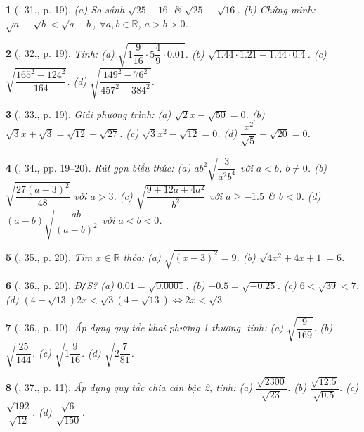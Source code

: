 \documentclass{article}
\newtheorem{baitoan}{}
\begin{document}
\begin{baitoan}[\cite{SGK_Toan_9_tap_1}, 31., p. 19]
	(a) So sánh $\sqrt{25 - 16}$ \& $\sqrt{25} - \sqrt{16}$. (b) Chứng minh: $\sqrt{a} - \sqrt{b} < \sqrt{a - b}$, $\forall a,b\in\mathbb{R}$, $a > b > 0$.
\end{baitoan}

\begin{baitoan}[\cite{SGK_Toan_9_tap_1}, 32., p. 19]
	Tính: (a) $\sqrt{1\dfrac{9}{16}\cdot5\dfrac{4}{9}\cdot0.01}$. (b) $\sqrt{1.44\cdot1.21 - 1.44\cdot0.4}$. (c) $\sqrt{\dfrac{165^2 - 124^2}{164}}$. (d) $\sqrt{\dfrac{149^2 - 76^2}{457^2 - 384^2}}$.
\end{baitoan}

\begin{baitoan}[\cite{SGK_Toan_9_tap_1}, 33., p. 19]
	Giải phương trình: (a)  $\sqrt{2}x - \sqrt{50} = 0$. (b) $\sqrt{3}x + \sqrt{3} = \sqrt{12} + \sqrt{27}$. (c) $\sqrt{3}x^2 - \sqrt{12} = 0$. (d) $\dfrac{x^2}{\sqrt{5}} - \sqrt{20} = 0$.
\end{baitoan}

\begin{baitoan}[\cite{SGK_Toan_9_tap_1}, 34., pp. 19--20]
	Rút gọn biểu thức: (a) $ab^2\sqrt{\dfrac{3}{a^2b^4}}$ với $a < b$, $b\ne0$. (b) $\sqrt{\dfrac{27(a - 3)^2}{48}}$ với $a > 3$. (c) $\sqrt{\dfrac{9 + 12a + 4a^2}{b^2}}$ với $a\ge-1.5$ \& $b < 0$. (d) $(a - b)\sqrt{\dfrac{ab}{(a - b)^2}}$ với $a < b < 0$.
\end{baitoan}

\begin{baitoan}[\cite{SGK_Toan_9_tap_1}, 35., p. 20]
	Tìm $x\in\mathbb{R}$ thỏa: (a) $\sqrt{(x - 3)^2} = 9$. (b) $\sqrt{4x^2 + 4x + 1} = 6$.
\end{baitoan}

\begin{baitoan}[\cite{SGK_Toan_9_tap_1}, 36., p. 20]
	\emph{Đ\texttt{/}S?} (a) $0.01 = \sqrt{0.0001}$. (b) $-0.5 = \sqrt{-0.25}$. (c) $6 < \sqrt{39} < 7$. (d) $(4 - \sqrt{13})2x < \sqrt{3}(4 - \sqrt{13})\Leftrightarrow2x < \sqrt{3}$.
\end{baitoan}

\begin{baitoan}[\cite{SBT_Toan_9_tap_1}, 36., p. 10]
	Áp dụng quy tắc khai phương 1 thương, tính: (a) $\sqrt{\dfrac{9}{169}}$. (b) $\sqrt{\dfrac{25}{144}}$. (c) $\sqrt{1\dfrac{9}{16}}$. (d) $\sqrt{2\dfrac{7}{81}}$.
\end{baitoan}

\begin{baitoan}[\cite{SBT_Toan_9_tap_1}, 37., p. 11]
	Áp dụng quy tắc chia căn bậc 2, tính: (a) $\dfrac{\sqrt{2300}}{\sqrt{23}}$. (b) $\dfrac{\sqrt{12.5}}{\sqrt{0.5}}$. (c) $\dfrac{\sqrt{192}}{\sqrt{12}}$. (d) $\dfrac{\sqrt{6}}{\sqrt{150}}$.
\end{baitoan}
\end{document}
